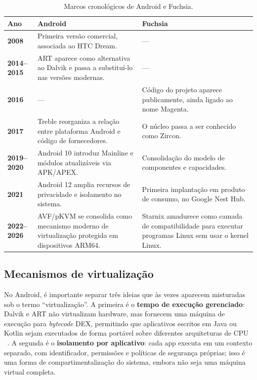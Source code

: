 \documentclass[12pt,a4paper]{article}
\begin{document}
\begin{table}[htbp]
  \centering
  \caption{Marcos cronológicos de Android e Fuchsia.}
  \label{tab:cronologia}
  \begin{tabular}{>{\bfseries}l p{5.5cm} p{5.5cm}}
    \toprule
    Ano & Android & Fuchsia \\
    \midrule
    2008 & Primeira versão comercial, associada ao HTC Dream. & --- \\
    2014--2015 & ART aparece como alternativa ao Dalvik e passa a substituí-lo nas versões modernas. & --- \\
    2016 & --- & Código do projeto aparece publicamente, ainda ligado ao nome Magenta. \\
    2017 & Treble reorganiza a relação entre plataforma Android e código de fornecedores. & O núcleo passa a ser conhecido como Zircon. \\
    2019--2020 & Android 10 introduz Mainline e módulos atualizáveis via APK/APEX. & Consolidação do modelo de componentes e capacidades. \\
    2021 & Android 12 amplia recursos de privacidade e isolamento no sistema. & Primeira implantação em produto de consumo, no Google Nest Hub. \\
    2022--2026 & AVF/pKVM se consolida como mecanismo moderno de virtualização protegida em dispositivos ARM64. & Starnix amadurece como camada de compatibilidade para executar programas Linux sem usar o kernel Linux. \\
    \bottomrule
  \end{tabular}
\end{table}

\subsection{Mecanismos de virtualização}

No Android, é importante separar três ideias que às vezes aparecem misturadas sob
o termo ``virtualização''. A primeira é o \textbf{tempo de execução gerenciado}:
Dalvik e ART não virtualizam hardware, mas fornecem uma máquina de execução para
\emph{bytecode} DEX, permitindo que aplicativos escritos em Java ou Kotlin sejam
executados de forma portável sobre diferentes arquiteturas de CPU
~\cite{androidruntime}. A segunda é o \textbf{isolamento por aplicativo}: cada app
executa em um contexto separado, com identificador, permissões e políticas de
segurança próprias; isso é uma forma de compartimentalização do sistema, embora
não seja uma máquina virtual completa.
\end{document}
